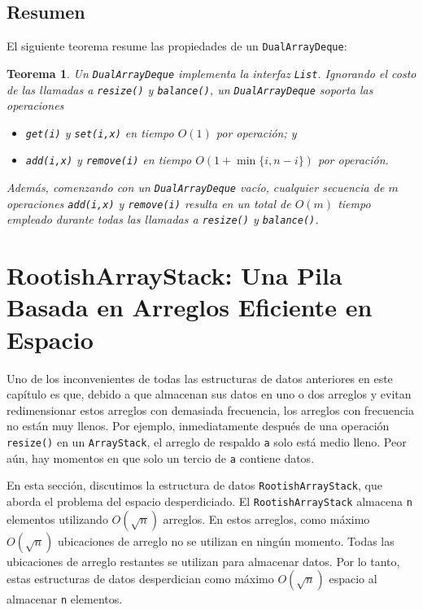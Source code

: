 \documentclass[11pt]{book}
\theoremstyle{plain}
\newtheorem{teorema}{Teorema}[chapter]
\begin{document}
\subsection{Resumen}

El siguiente teorema resume las propiedades de un \texttt{DualArrayDeque}:

\begin{teorema}
Un \texttt{DualArrayDeque} implementa la interfaz \texttt{List}. Ignorando el costo de las llamadas a \texttt{resize()} y \texttt{balance()}, un \texttt{DualArrayDeque} soporta las operaciones

\begin{itemize}
    \item \texttt{get(i)} y \texttt{set(i,x)} en tiempo $O(1)$ por operación; y
    \item \texttt{add(i,x)} y \texttt{remove(i)} en tiempo $O(1 + \min\{i, n-i\})$ por operación.
\end{itemize}

Además, comenzando con un \texttt{DualArrayDeque} vacío, cualquier secuencia de $m$ operaciones \texttt{add(i,x)} y \texttt{remove(i)} resulta en un total de $O(m)$ tiempo empleado durante todas las llamadas a \texttt{resize()} y \texttt{balance()}.
\end{teorema}

\section{RootishArrayStack: Una Pila Basada en Arreglos Eficiente en Espacio}

Uno de los inconvenientes de todas las estructuras de datos anteriores en este capítulo es que, debido a que almacenan sus datos en uno o dos arreglos y evitan redimensionar estos arreglos con demasiada frecuencia, los arreglos con frecuencia no están muy llenos. Por ejemplo, inmediatamente después de una operación \texttt{resize()} en un \texttt{ArrayStack}, el arreglo de respaldo \texttt{a} solo está medio lleno. Peor aún, hay momentos en que solo un tercio de \texttt{a} contiene datos.

En esta sección, discutimos la estructura de datos \texttt{RootishArrayStack}, que aborda el problema del espacio desperdiciado. El \texttt{RootishArrayStack} almacena \texttt{n} elementos utilizando $O(\sqrt{n})$ arreglos. En estos arreglos, como máximo $O(\sqrt{n})$ ubicaciones de arreglo no se utilizan en ningún momento. Todas las ubicaciones de arreglo restantes se utilizan para almacenar datos. Por lo tanto, estas estructuras de datos desperdician como máximo $O(\sqrt{n})$ espacio al almacenar \texttt{n} elementos.
\end{document}
